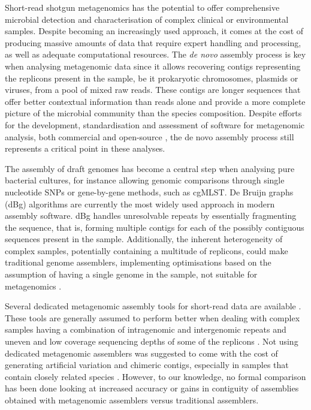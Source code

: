 Short-read shotgun metagenomics has the potential to offer comprehensive microbial detection and characterisation of complex clinical or environmental samples.  Despite becoming an increasingly used approach, it comes at the cost of producing massive amounts of data that require expert handling and processing, as well as adequate computational resources. The \textit{de novo} assembly process is key when analysing metagenomic data since it allows recovering contigs representing the replicons present in the sample, be it prokaryotic chromosomes, plasmids or viruses, from a pool of mixed raw reads. These contigs are longer sequences that offer better contextual information than reads alone and provide a more complete picture of the microbial community than the species composition. Despite efforts for the development, standardisation and assessment of software for metagenomic analysis, both commercial and open-source \cite{angers-loustau_challenges_2018,gruening_recommendations_2019, sczyrba_critical_2017, couto_critical_2018, meyer_critical_2021}, the de novo assembly process still represents a critical point in these analyses.

The assembly of draft genomes has become a central step when analysing pure bacterial cultures, for instance allowing genomic comparisons through single nucleotide \ac{SNP}s or gene-by-gene methods, such as \ac{cgMLST}. De Bruijn graphs (dBg) algorithms are currently the most widely used approach in modern assembly software. dBg handles unresolvable repeats by essentially fragmenting the sequence, that is, forming multiple contigs for each of the possibly contiguous sequences present in the sample. Additionally, the inherent heterogeneity of complex samples, potentially containing a multitude of replicons, could make traditional genome assemblers, implementing optimisations based on the assumption of having a single genome in the sample, not suitable for metagenomics \cite{ayling_new_2020}.

Several dedicated metagenomic assembly tools for short-read data are available \cite{ayling_new_2020}. These tools are generally assumed to perform better when dealing with complex samples having a combination of intragenomic and intergenomic repeats and uneven and low coverage sequencing depths of some of the replicons \cite{olson_metagenomic_2019}. Not using dedicated metagenomic assemblers was suggested to come with the cost of generating artificial variation and chimeric contigs, especially in samples that contain closely related species \cite{teeling_current_2012}. However, to our knowledge, no formal comparison has been done looking at increased accuracy or gains in contiguity of assemblies obtained with metagenomic assemblers versus traditional assemblers.


